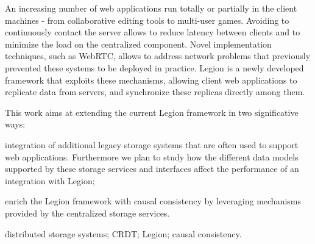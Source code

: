 An increasing number of web applications run totally or partially in the client machines - from collaborative editing tools to multi-user games. Avoiding to continuously contact the server allows to reduce latency between clients and to minimize the load on the centralized component. Novel implementation techniques, such as WebRTC, allows to address network problems that previously prevented these systems to be deployed in practice. Legion is a newly developed framework that exploits these mechanisms, allowing client web applications to replicate data from servers, and synchronize these replicas directly among them.\par
	This work aims at extending the current Legion framework in two significative ways: \begin{enumerate*}[(i)]
	\item integration of additional legacy storage systems that are often used to support web applications. Furthermore we plan to study how the different data models supported by these storage services and interfaces affect the performance of an integration with Legion;
	\item enrich the Legion framework with causal consistency by leveraging mechanisms provided by the centralized storage services.

\end{enumerate*}

\begin{keywords}
distributed storage systems; CRDT; Legion; causal consistency.
\end{keywords} 
